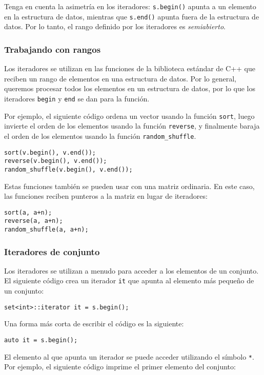 Tenga en cuenta la asimetría en los iteradores:
\texttt{s.begin()} apunta a un elemento en la estructura de datos,
mientras que \texttt{s.end()} apunta fuera de la estructura de datos.
Por lo tanto, el rango definido por los iteradores es \emph{semiabierto}.

\subsubsection{Trabajando con rangos}

Los iteradores se utilizan en las funciones de la biblioteca estándar de C++
que reciben un rango de elementos en una estructura de datos.
Por lo general, queremos procesar todos los elementos en un
estructura de datos, por lo que los iteradores
\texttt{begin} y \texttt{end} se dan para la función.

Por ejemplo, el siguiente código ordena un vector
usando la función \texttt{sort},
luego invierte el orden de los elementos usando la función
\texttt{reverse}, y finalmente baraja el orden de
los elementos usando la función \texttt{random\_shuffle}.


\begin{lstlisting}
sort(v.begin(), v.end());
reverse(v.begin(), v.end());
random_shuffle(v.begin(), v.end());
\end{lstlisting}

Estas funciones también se pueden usar con una matriz ordinaria.
En este caso, las funciones reciben punteros a la matriz
en lugar de iteradores:

\newpage
\begin{lstlisting}
sort(a, a+n);
reverse(a, a+n);
random_shuffle(a, a+n);
\end{lstlisting}

\subsubsection{Iteradores de conjunto}

Los iteradores se utilizan a menudo para acceder a los elementos de un conjunto.
El siguiente código crea un iterador
\texttt{it} que apunta al elemento más pequeño de un conjunto:
\begin{lstlisting}
set<int>::iterator it = s.begin();
\end{lstlisting}
Una forma más corta de escribir el código es la siguiente:
\begin{lstlisting}
auto it = s.begin();
\end{lstlisting}
El elemento al que apunta un iterador
se puede acceder utilizando el símbolo \texttt{*}.
Por ejemplo, el siguiente código imprime
el primer elemento del conjunto:

